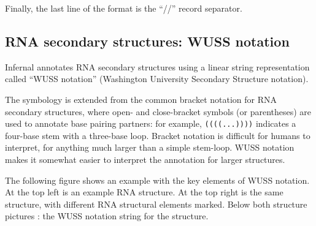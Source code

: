Finally, the last line of the format is the ``//'' record separator.

\subsection{RNA secondary structures: WUSS notation}
\label{section:wuss}

Infernal annotates RNA secondary structures using a linear
string representation called ``WUSS notation'' (Washington University
Secondary Structure notation).

The symbology is extended from the common bracket notation for RNA
secondary structures, where open- and close-bracket symbols (or
parentheses) are used to annotate base pairing partners: for example,
\verb+((((...))))+ indicates a four-base stem with a three-base loop.
Bracket notation is difficult for humans to interpret, for anything
much larger than a simple stem-loop. WUSS notation makes it somewhat
easier to interpret the annotation for larger structures.

The following figure shows an example with the key elements of WUSS
notation.  At the top left is an example RNA structure. At the top
right is the same structure, with different RNA structural elements
marked. Below both structure pictures : the WUSS notation string for
the structure.

